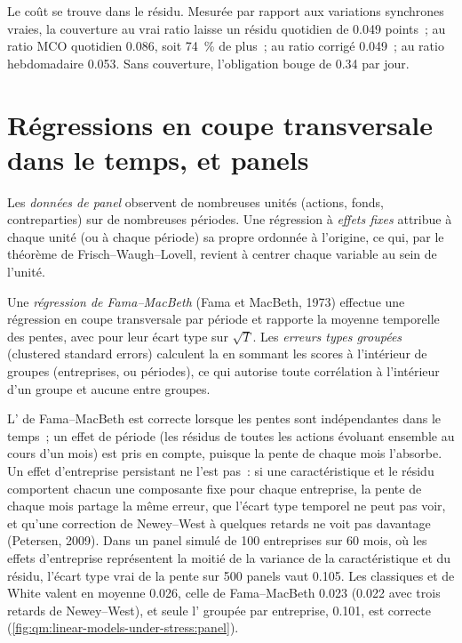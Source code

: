 Le coût se trouve dans le résidu. Mesurée par rapport aux variations synchrones vraies, la couverture au vrai ratio laisse un résidu quotidien de 0.049
points~; au ratio MCO quotidien 0.086, soit 74~\% de plus~; au ratio corrigé 0.049~; au ratio hebdomadaire 0.053. Sans couverture, l'obligation bouge de 0.34 par jour.

\section{Régressions en coupe transversale dans le temps, et panels}

\begin{definition}\label{def:qm:linear-models-under-stress:panel}
Les \emph{données de panel} observent de nombreuses unités (actions, fonds, contreparties) sur de nombreuses périodes. Une régression à \emph{effets fixes}
attribue à chaque unité (ou à chaque période) sa propre ordonnée à l'origine, ce qui, par le théorème de Frisch--Waugh--Lovell, revient à centrer chaque variable
au sein de l'unité.
\end{definition}

\begin{definition}\label{def:qm:linear-models-under-stress:fm}
Une \emph{régression de Fama--MacBeth} (Fama et MacBeth, 1973) effectue une régression en coupe transversale par période et
rapporte la moyenne temporelle des pentes, avec pour  leur écart type sur $\sqrt T$. Les \emph{erreurs types groupées} (clustered
standard errors) calculent la  en sommant les scores à l'intérieur de groupes (entreprises, ou périodes), ce qui autorise toute
corrélation à l'intérieur d'un groupe et aucune entre groupes.
\end{definition}

L' de Fama--MacBeth est correcte lorsque les pentes sont indépendantes dans le temps~; un effet de période (les résidus de toutes les actions évoluant
ensemble au cours d'un mois) est pris en compte, puisque la pente de chaque mois l'absorbe. Un effet d'entreprise persistant ne l'est pas~: si une caractéristique et le résidu
comportent chacun une composante fixe pour chaque entreprise, la pente de chaque mois partage la même erreur, que l'écart type temporel ne peut pas voir, et qu'une correction
de Newey--West à quelques retards ne voit pas davantage (Petersen, 2009). Dans un panel simulé de 100 entreprises sur 60 mois, où les effets d'entreprise représentent la moitié
de la variance de la caractéristique et du résidu, l'écart type vrai de la pente sur 500 panels vaut 0.105. Les  classiques et de White valent en moyenne 0.026, celle de Fama--MacBeth 0.023 (0.022 avec trois retards de Newey--West),
et seule l' groupée par entreprise, 0.101,
est correcte (\cref{fig:qm:linear-models-under-stress:panel}).

